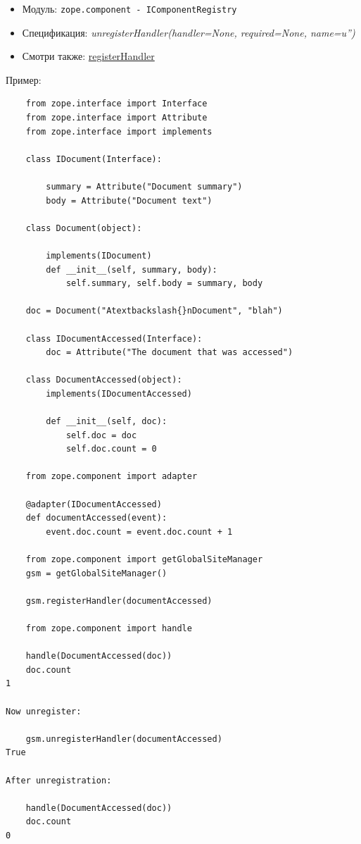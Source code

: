 \documentclass[a4paper,openany,twoside,draft]{book}
\providecommand*{\DUroletitlereference}[1]{\textsl{#1}}
\begin{document}
\begin{itemize}

\item Модуль: \texttt{zope.component - IComponentRegistry}

\item Спецификация: \DUroletitlereference{unregisterHandler(handler=None, required=None, name=u'')}

\item Смотри также: \hyperref[registerhandler]{registerHandler}

\end{itemize}

Пример:

\begin{verbatim}
    from zope.interface import Interface
    from zope.interface import Attribute
    from zope.interface import implements

    class IDocument(Interface):

        summary = Attribute("Document summary")
        body = Attribute("Document text")

    class Document(object):

        implements(IDocument)
        def __init__(self, summary, body):
            self.summary, self.body = summary, body

    doc = Document("Atextbackslash{}nDocument", "blah")

    class IDocumentAccessed(Interface):
        doc = Attribute("The document that was accessed")

    class DocumentAccessed(object):
        implements(IDocumentAccessed)

        def __init__(self, doc):
            self.doc = doc
            self.doc.count = 0

    from zope.component import adapter

    @adapter(IDocumentAccessed)
    def documentAccessed(event):
        event.doc.count = event.doc.count + 1

    from zope.component import getGlobalSiteManager
    gsm = getGlobalSiteManager()

    gsm.registerHandler(documentAccessed)

    from zope.component import handle

    handle(DocumentAccessed(doc))
    doc.count
1

Now unregister:

    gsm.unregisterHandler(documentAccessed)
True

After unregistration:

    handle(DocumentAccessed(doc))
    doc.count
0
\end{verbatim}
\end{document}
